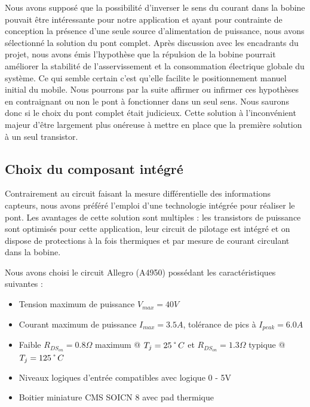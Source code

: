 \documentclass[11pt, french]{article} %
\begin{document}
Nous avons supposé que la possibilité d'inverser le sens du courant dans la bobine pouvait être intéressante pour notre application et ayant pour contrainte de conception la présence d'une seule source d'alimentation de puissance, nous avons sélectionné la solution du pont complet. Après discussion avec les encadrants du projet, nous avons émis l'hypothèse que la répulsion de la bobine pourrait améliorer la stabilité de l'asservissement et la consommation électrique globale du système. Ce qui semble certain c'est qu'elle facilite le positionnement manuel initial du mobile. Nous pourrons par la suite affirmer ou infirmer ces hypothèses en contraignant ou non le pont à fonctionner dans un seul sens. Nous saurons donc si le choix du pont complet était judicieux. Cette solution à l'inconvénient majeur d'être largement plus onéreuse à mettre en place que la première solution à un seul transistor.

\subsection{Choix du composant intégré}

Contrairement au circuit faisant la mesure différentielle des informations capteurs, nous avons préféré l'emploi d'une technologie intégrée pour réaliser le pont. Les avantages de cette solution sont multiples : les transistors de puissance sont optimisés pour cette application, leur circuit de pilotage est intégré et on dispose de protections à la fois thermiques et par mesure de courant circulant dans la bobine.

\medskip
\noindent
Nous avons choisi le circuit Allegro (A4950) possédant les caractéristiques suivantes :
\medskip
\begin{itemize}
	\item Tension maximum de puissance $ V_{max} = 40 V $
	\item Courant maximum de puissance $ I_{max} = 3.5 A $, tolérance de pics à $ I_{peak} = 6.0 A$
	\item Faible $R_{DS_{on}} = 0.8 \Omega $ maximum @ $ T_j = 25 \char23 C $ \newline
	et $R_{DS_{on}} = 1.3 \Omega $ typique @ $ T_j = 125 \char23 C $
	\item Niveaux logiques d'entrée compatibles avec logique 0 - 5V
	\item Boitier miniature CMS SOICN 8 avec pad thermique
\end {itemize}
\end{document}
